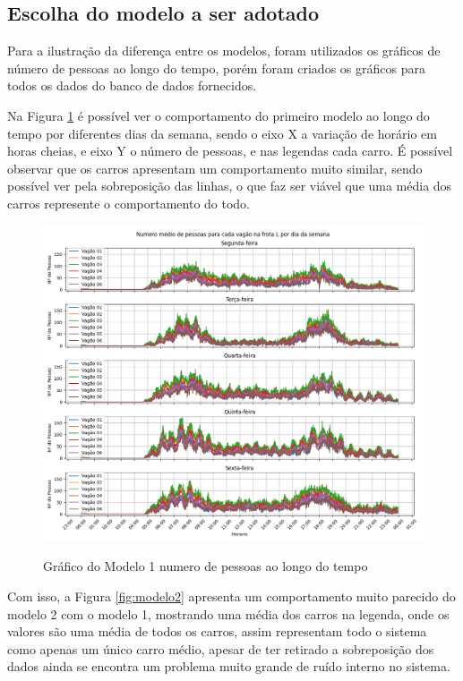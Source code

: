 \documentclass[acronym,symbols,table]{fei}
\begin{document}
\newpage 

\subsection{Escolha do modelo a ser adotado}

Para a ilustração da diferença entre os modelos, foram utilizados os gráficos de número de pessoas ao longo do tempo, porém foram criados os gráficos para todos os dados do banco de dados fornecidos. 

Na Figura \ref{fig:modelo1} é possível ver o comportamento do primeiro modelo ao longo do tempo por diferentes dias da semana, sendo o eixo X a variação de horário em horas cheias, e eixo Y o número de pessoas, e nas legendas cada carro. É possível observar que os carros apresentam um comportamento muito similar, sendo possível ver pela sobreposição das linhas, o que faz ser viável que uma média dos carros represente o comportamento do todo.

\begin{figure}[!htb]
    \centering
	\caption{Gráfico do Modelo 1 numero de pessoas ao longo do tempo}
    \includegraphics[width=0.8\linewidth]{Imagens/Modelo_1-Numero_medio_de_pessoas_para_cada_vagao_na_frota_L_por_dia_da_semana.png}
    \label{fig:modelo1}
\end{figure}

\newpage 

Com isso, a Figura \ref{fig:modelo2} apresenta um comportamento muito parecido do modelo 2 com o modelo 1, mostrando uma média dos carros na legenda, onde os valores são uma média de todos os carros, assim representam todo o sistema como apenas um único carro médio, apesar de ter retirado a sobreposição dos dados ainda se encontra um problema muito grande de ruído interno no sistema. 
\end{document}

